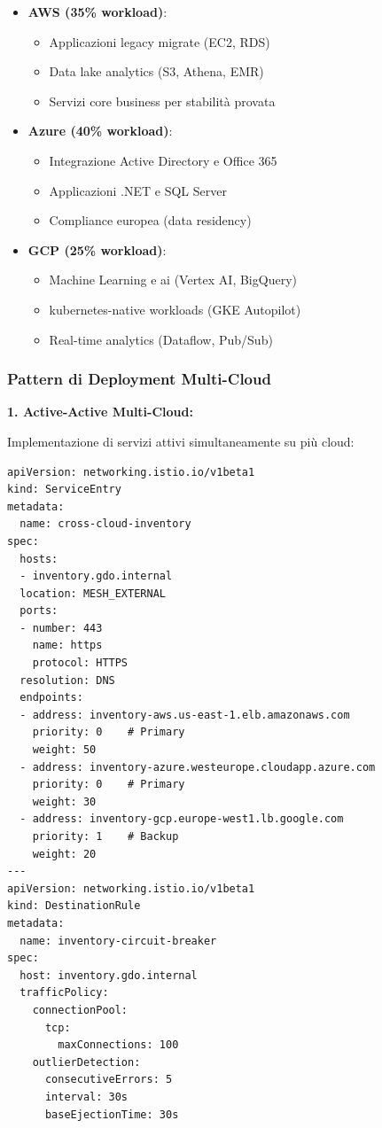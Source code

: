 \begin{itemize}
    \item \textbf{AWS (35\% workload)}:
    \begin{itemize}
        \item Applicazioni legacy migrate (EC2, RDS)
        \item Data lake analytics (S3, Athena, EMR)
        \item Servizi core business per stabilità provata
    \end{itemize}
    
    \item \textbf{Azure (40\% workload)}:
    \begin{itemize}
        \item Integrazione Active Directory e Office 365
        \item Applicazioni .NET e SQL Server
        \item Compliance europea (data residency)
    \end{itemize}
    
    \item \textbf{GCP (25\% workload)}:
    \begin{itemize}
        \item Machine Learning e \gls{ai} (Vertex AI, BigQuery)
        \item \gls{kubernetes}-native workloads (GKE Autopilot)
        \item Real-time analytics (Dataflow, Pub/Sub)
    \end{itemize}
\end{itemize}

\subsubsection{\texorpdfstring{Pattern di Deployment Multi-Cloud}{3.4.2.2 - Pattern di Deployment Multi-Cloud}}

\textbf{1. Active-Active Multi-Cloud:}

Implementazione di servizi attivi simultaneamente su più cloud:

\begin{lstlisting}[caption={\gls{kubernetes} Multi-Cloud Service},label={lst:multicloud_k8s}]
apiVersion: networking.istio.io/v1beta1
kind: ServiceEntry
metadata:
  name: cross-cloud-inventory
spec:
  hosts:
  - inventory.gdo.internal
  location: MESH_EXTERNAL
  ports:
  - number: 443
    name: https
    protocol: HTTPS
  resolution: DNS
  endpoints:
  - address: inventory-aws.us-east-1.elb.amazonaws.com
    priority: 0    # Primary
    weight: 50
  - address: inventory-azure.westeurope.cloudapp.azure.com
    priority: 0    # Primary
    weight: 30
  - address: inventory-gcp.europe-west1.lb.google.com
    priority: 1    # Backup
    weight: 20
---
apiVersion: networking.istio.io/v1beta1
kind: DestinationRule
metadata:
  name: inventory-circuit-breaker
spec:
  host: inventory.gdo.internal
  trafficPolicy:
    connectionPool:
      tcp:
        maxConnections: 100
    outlierDetection:
      consecutiveErrors: 5
      interval: 30s
      baseEjectionTime: 30s
\end{lstlisting}

